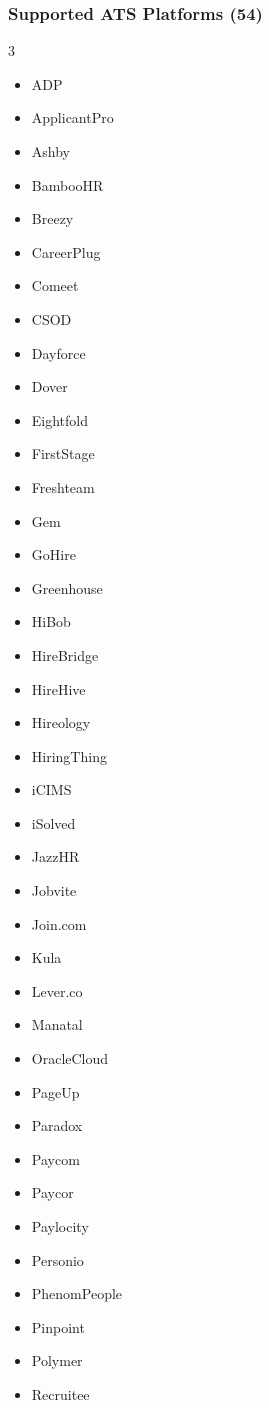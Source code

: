 \documentclass[11pt, a4paper]{article}
\begin{document}
\subsubsection{Supported ATS Platforms (54)}

\begin{multicols}{3}
\begin{itemize}[leftmargin=1em, itemsep=0pt, parsep=0pt]
\scriptsize
    \item ADP \item ApplicantPro \item Ashby \item BambooHR \item Breezy
    \item CareerPlug \item Comeet \item CSOD \item Dayforce \item Dover
    \item Eightfold \item FirstStage \item Freshteam \item Gem \item GoHire
    \item Greenhouse \item HiBob \item HireBridge \item HireHive \item Hireology
    \item HiringThing \item iCIMS \item iSolved \item JazzHR \item Jobvite
    \item Join.com \item Kula \item Lever.co \item Manatal \item OracleCloud
    \item PageUp \item Paradox \item Paycom \item Paycor \item Paylocity
    \item Personio \item PhenomPeople \item Pinpoint \item Polymer \item Recruitee

\end{itemize}
\end{multicols}
\end{document}
